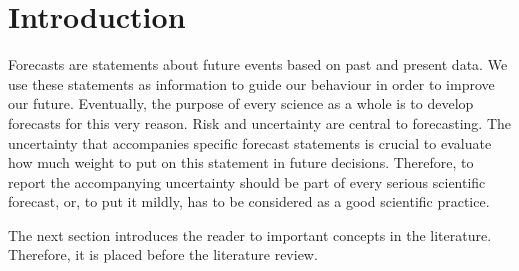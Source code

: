 \section{Introduction}
\thispagestyle{plain} %

Forecasts are statements about future events based on past and present data. We use these statements as information to guide our behaviour in order to improve our future. Eventually, the purpose of every science as a whole is to develop forecasts for this very reason. Risk and uncertainty are central to forecasting. The uncertainty that accompanies specific forecast statements is crucial to evaluate how much weight to put on this statement in future decisions. Therefore, to report the accompanying uncertainty should be part of every serious scientific forecast, or, to put it mildly, has to be considered as a good scientific practice.

The next section introduces the reader to important concepts in the literature. Therefore, it is placed before the literature review.









